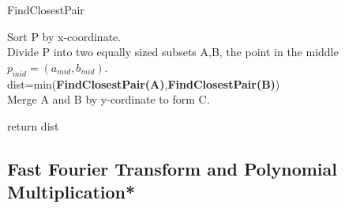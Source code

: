 \begin{algorithm}
    \caption{FindClosestPair}
    
    Sort P by x-coordinate.\\
    Divide P into two equally sized subsets A,B, the point in the middle $p_{mid}=(a_{mid},b_{mid})$.\\
    dist=min(\textbf{FindClosestPair(A)},\textbf{FindClosestPair(B)})\\
    Merge A and B by y-cordinate to form C.\\

    return dist
\end{algorithm}

\subsection{Fast Fourier Transform and Polynomial Multiplication*}



        
